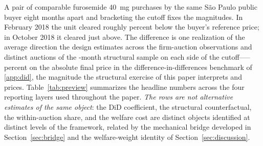 A pair of comparable furosemide 40~mg purchases by the same S\~ao Paulo public buyer eight months apart and bracketing the cutoff fixes the magnitudes. In February 2018 the unit cleared roughly \furosBelowRefPct{} percent below the buyer's reference price; in October 2018 it cleared just above. The difference is one realization of the average direction the design estimates across the \nObsAuctions{} firm-auction observations and \nDistinctAuctions{} distinct auctions of the \structuralWindowM-month structural sample on each side of the \policyCutoffMonth{} cutoff---\didLowerPct{}--\didUpperPct{} percent on the absolute final price in the difference-in-differences benchmark of \ref{app:did}, the magnitude the structural exercise of this paper interprets and prices. Table~\ref{tab:preview} summarizes the headline numbers across the four reporting layers used throughout the paper. \emph{The rows are not alternative estimates of the same object}: the DiD coefficient, the structural counterfactual, the within-auction share, and the welfare cost are distinct objects identified at distinct levels of the framework, related by the mechanical bridge developed in Section~\ref{sec:bridge} and the welfare-weight identity of Section~\ref{sec:discussion}.

